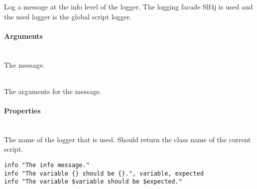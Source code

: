 %


Log a message at the info level of the logger.
The logging facade Slf4j\cite{slf4j13} is used and the used logger is
the global script logger.

\paragraph{Arguments}

\begin{asparadesc}
%
\item[\code{message}] \hfill \\
The message.
%
\item[\code{args}] \hfill \\
The arguments for the message.
%
\end{asparadesc}

\paragraph{Properties}

\begin{asparadesc}
%
\item[\code{name}] \hfill \\
The name of the logger that is used. Should return the class name of the current
script.
%
\end{asparadesc}

\begin{lstlisting}[style=Groovybash, label={lst:example_info}]
info "The info message."
info "The variable {} should be {}.", variable, expected
info "The variable $variable should be $expected."
\end{lstlisting}


